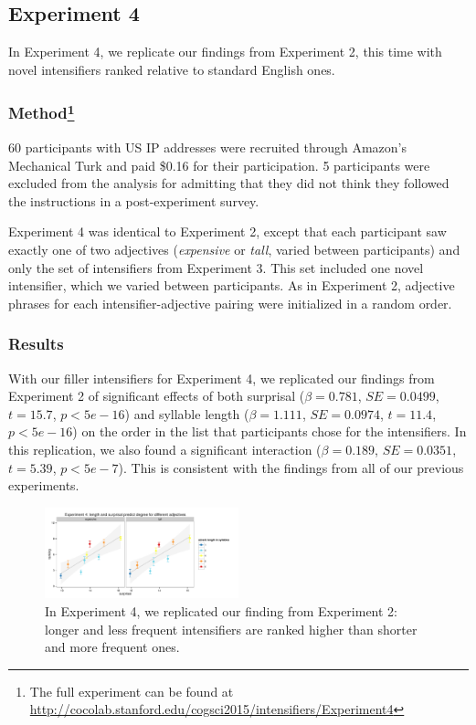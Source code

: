 \documentclass[10pt,letterpaper]{article}
\newcommand{\w}[1]{\emph{#1}}
\begin{document}
\subsection{Experiment 4}

In Experiment 4, we replicate our findings from Experiment 2, this time with novel intensifiers ranked relative to standard English ones.

\subsubsection{Method\footnote{The full experiment can be found at \url{http://cocolab.stanford.edu/cogsci2015/intensifiers/Experiment4}}}
60 participants with US IP addresses were recruited through Amazon's Mechanical Turk and paid \$0.16 for their participation. 5 participants were excluded from the analysis for admitting that they did not think they followed the instructions in a post-experiment survey.

Experiment 4 was identical to Experiment 2, except that each participant saw exactly one of two adjectives (\w{expensive} or \w{tall}, varied between participants) and only the set of intensifiers from Experiment 3. This set included one novel intensifier, which we varied between participants. As in Experiment 2, adjective phrases for each intensifier-adjective pairing were initialized in a random order.

\subsubsection{Results}
With our filler intensifiers for Experiment 4, we replicated our findings from Experiment 2 of significant effects of both surprisal ($\beta=0.781$, $SE=0.0499$, $t=15.7$, $p<5e-16$)
and syllable length ($\beta=1.111$, $SE=0.0974$, $t=11.4$, $p<5e-16$) on the order in the list that participants chose for the intensifiers.
In this replication, we also found a significant
interaction ($\beta=0.189$, $SE=0.0351$, $t=5.39$, $p<5e-7$). This is consistent with the findings from all of our previous experiments.

\begin{figure}[hbt]
\begin{center}
\includegraphics[width=0.5\textwidth]{exp4_replication.pdf}
\end{center}
\caption{In Experiment 4, we replicated our finding from Experiment 2: longer and less frequent intensifiers are ranked higher than shorter and more frequent ones.} 
\label{exp4_replication}
\end{figure}
\end{document}
